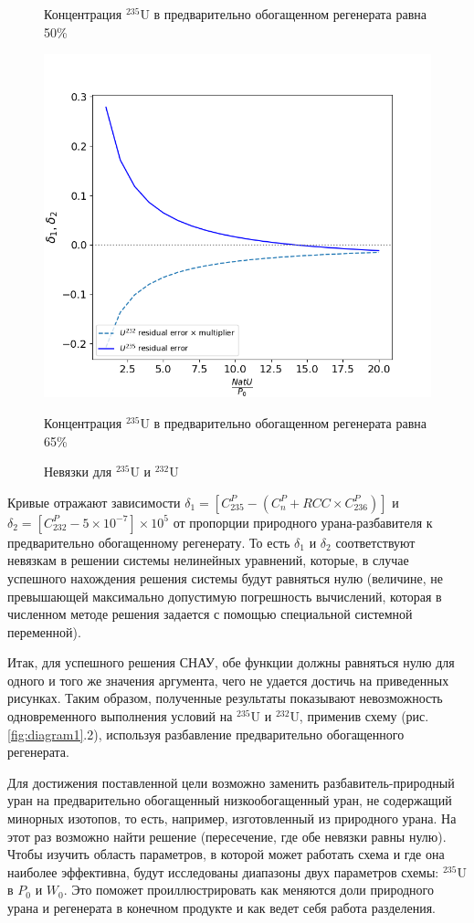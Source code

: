 \begin{figure}[ht]
\begin{minipage}{.5\textwidth}
    \caption{Концентрация $^{235}$U в предварительно обогащенном регенерата равна 50\%}
  \end{minipage}
  \begin{minipage}{.5\textwidth}
    \centering
    \includegraphics[width=.8\linewidth]{images/plots/65}  
    \caption{Концентрация $^{235}$U в предварительно обогащенном регенерата равна 65\%}
  \end{minipage}
  \caption{Невязки для $^{235}$U и $^{232}$U}
  \label{fig:deltas_ordinar}
 \end{figure}

Кривые отражают зависимости $\delta_1=\left[C_{235}^P-\left(C_n^P+RCC\times C_{236}^P\right)\right]$ и $\delta_2=\left[C_{232}^P-5\times10^{-7}\right]\times10^5$ от пропорции природного урана-разбавителя к предварительно обогащенному регенерату. То есть $\delta_1$ и $\delta_2$ соответствуют невязкам в решении системы нелинейных уравнений, которые, в случае успешного нахождения решения системы будут равняться нулю (величине, не превышающей максимально допустимую погрешность вычислений, которая в численном методе решения задается с помощью специальной системной переменной).

Итак, для успешного решения СНАУ, обе функции должны равняться нулю для одного и того же значения аргумента, чего не удается достичь на приведенных рисунках.
Таким образом, полученные результаты показывают невозможность одновременного выполнения условий на $^{235}$U и $^{232}$U, применив схему (рис. \ref{fig:diagram1}.2), используя разбавление предварительно обогащенного регенерата.

Для достижения поставленной цели возможно заменить разбавитель-природный уран на предварительно обогащенный низкообогащенный уран, не содержащий минорных изотопов, то есть, например, изготовленный из природного урана. На этот раз возможно найти решение (пересечение, где обе невязки равны нулю). Чтобы изучить область параметров, в которой может работать схема  и где она наиболее эффективна, будут исследованы диапазоны двух параметров схемы: $^{235}$U в $P_0$ и $W_0$. Это поможет проиллюстрировать как меняются доли природного урана и регенерата в конечном продукте и как ведет себя работа разделения.

